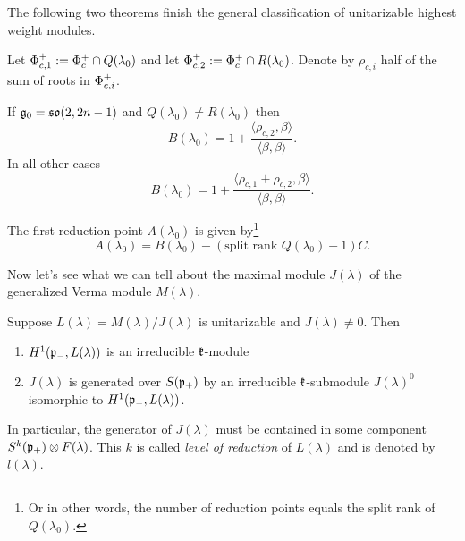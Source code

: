 The following two theorems finish the general classification of unitarizable highest weight modules.

\begin{theorem}
 Let $\Phi^+_{c,1} := \Phi^+_c \cap Q(\lambda_0)$ and let $\Phi^+_{c,2} := \Phi^+_c \cap R(\lambda_0)$. Denote by $\rho_{c,i}$ half of the sum of roots in $\Phi^+_{c,i}$.
 
 If $\mathfrak{g}_0=\mathfrak{so}(2,2n-1)$ and $Q(\lambda_0) \neq R(\lambda_0)$ then \[B(\lambda_0) = 1 + \frac{\langle \rho_{c,2},\beta\rangle}{\langle \beta, \beta \rangle}.\]
 In all other cases \[B(\lambda_0) = 1 + \frac{ \langle \rho_{c,1} + \rho_{c,2} , \beta \rangle}{\langle \beta, \beta \rangle}.\]
\end{theorem}


\begin{theorem}\label{thm:reduction_points}
 The first reduction point $A(\lambda_0)$ is given by\footnote{Or in other words, the number of reduction points equals the split rank of $Q(\lambda_0)$.}
 \[
   A(\lambda_0) = B(\lambda_0) - (\text{split rank } Q(\lambda_0) -1) C.
 \]
\end{theorem}

Now let's see what we can tell about the maximal module $J(\lambda)$ of the generalized Verma module $M(\lambda)$. %

\begin{theorem}
 Suppose $L(\lambda) = M(\lambda)/J(\lambda)$ is unitarizable and $J(\lambda)\neq 0$. Then
 \begin{enumerate}
  \item $H^1(\mathfrak{p}_-,L(\lambda))$ is an irreducible $\mathfrak{k}$-module
  \item $J(\lambda)$ is generated over $S(\mathfrak{p}_+)$ by an irreducible $\mathfrak{k}$-submodule $J(\lambda)^0$ isomorphic to $H^1(\mathfrak{p}_-,L(\lambda))$.
 \end{enumerate}
\end{theorem}


In particular, the generator of $J(\lambda)$ must be contained in some component $S^k(\mathfrak{p}_+)\otimes F(\lambda)$. This $k$ is called \emph{level of reduction} of $L(\lambda)$ and is denoted by $l(\lambda)$.

